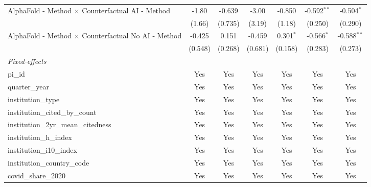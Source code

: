 \begin{tabular}{lcccccc}
   AlphaFold - Method $\times$ Counterfactual AI - Method      & -1.80         & -0.639        & -3.00          & -0.850        & -0.592$^{**}$ & -0.504$^{*}$\\   
                                                               & (1.66)        & (0.735)       & (3.19)         & (1.18)        & (0.250)       & (0.290)\\   
   AlphaFold - Method $\times$ Counterfactual No AI - Method   & -0.425        & 0.151         & -0.459         & 0.301$^{*}$   & -0.566$^{*}$  & -0.588$^{**}$\\   
                                                               & (0.548)       & (0.268)       & (0.681)        & (0.158)       & (0.283)       & (0.273)\\   
   \midrule
   \emph{Fixed-effects}\\
   pi\_id                                                      & Yes           & Yes           & Yes            & Yes           & Yes           & Yes\\  
   quarter\_year                                               & Yes           & Yes           & Yes            & Yes           & Yes           & Yes\\  
   institution\_type                                           & Yes           & Yes           & Yes            & Yes           & Yes           & Yes\\  
   institution\_cited\_by\_count                               & Yes           & Yes           & Yes            & Yes           & Yes           & Yes\\  
   institution\_2yr\_mean\_citedness                           & Yes           & Yes           & Yes            & Yes           & Yes           & Yes\\  
   institution\_h\_index                                       & Yes           & Yes           & Yes            & Yes           & Yes           & Yes\\  
   institution\_i10\_index                                     & Yes           & Yes           & Yes            & Yes           & Yes           & Yes\\  
   institution\_country\_code                                  & Yes           & Yes           & Yes            & Yes           & Yes           & Yes\\  
   covid\_share\_2020                                          & Yes           & Yes           & Yes            & Yes           & Yes           & Yes\\  

\end{tabular}
